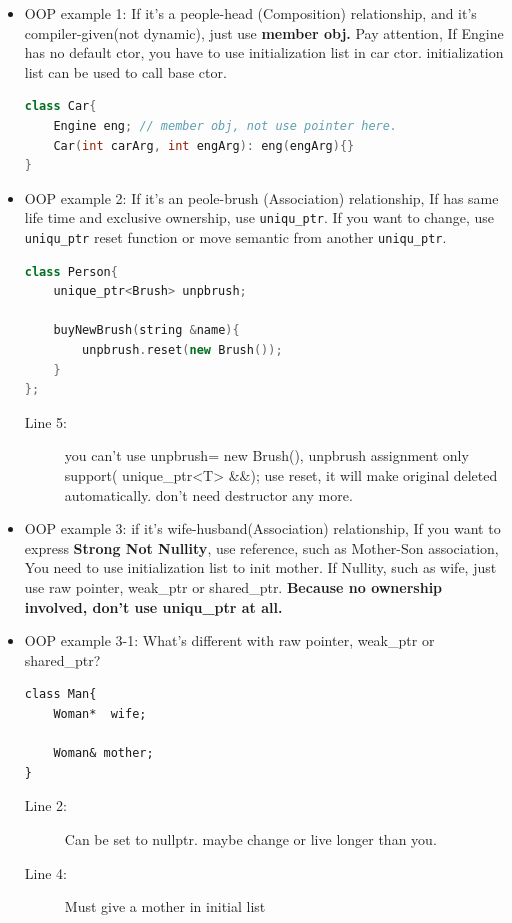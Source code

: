 \documentclass[a4paper,11pt,twoside]{book}
\begin{document}
\begin{itemize}
	\item OOP example 1: If it's a people-head (Composition) relationship, and it's compiler-given(not dynamic), just use \textbf{member obj.}   Pay attention, If Engine has no default ctor, you have to use initialization list in car ctor.  initialization list can be used to call base ctor.
\begin{lstlisting}[frame=single, language=c++]
class Car{
	Engine eng; // member obj, not use pointer here.
	Car(int carArg, int engArg): eng(engArg){}
}
	\end{lstlisting}
	
	
	\item OOP example 2:  If it's an peole-brush (Association) relationship, If has same life time and exclusive ownership, use \texttt{uniqu\_ptr}. If you want to change, use \texttt{uniqu\_ptr} reset function or move semantic from another \texttt{uniqu\_ptr}.
\begin{lstlisting}[frame=single, language=c++]
class Person{
	unique_ptr<Brush> unpbrush;
	
	buyNewBrush(string &name){
		unpbrush.reset(new Brush());
	}
};
\end{lstlisting}
\begin{description}
	\item[Line 5:] you can't use unpbrush= new Brush(), unpbrush assignment only support( unique\_ptr<T> \&\&); use reset, it will make original deleted automatically. don't need destructor any more.
\end{description}
	
	\item OOP example 3: if it's wife-husband(Association) relationship, If you want to express \textbf{Strong Not Nullity}, use reference, such as Mother-Son association, You need to use initialization list to init mother. If Nullity, such as wife, just use raw pointer, weak\_ptr or shared\_ptr. \textbf{Because no ownership involved, don't use uniqu\_ptr at all. }
	
	\item OOP example 3-1: What's different with raw pointer, weak\_ptr or shared\_ptr?
	\begin{lstlisting}[numbers=none]
class Man{
	Woman*  wife; 
	
	Woman& mother; 
}
\end{lstlisting}
\begin{description}
	\item[Line 2:] Can be set to nullptr. maybe change or live longer than you.
	\item[Line 4:] Must give a mother in initial list
\end{description}
	

\end{itemize}
\end{document}
